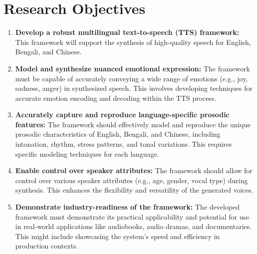 \section*{Research Objectives}

\begin{enumerate}
    \parsep=20pt
    \item \textbf{Develop a robust multilingual text-to-speech (TTS) framework:} This framework will support the synthesis of high-quality speech for English, Bengali, and Chinese. 
    \item \textbf{Model and synthesize nuanced emotional expression:} The framework must be capable of accurately conveying a wide range of emotions (e.g., joy, sadness, anger) in synthesized speech. This involves developing techniques for accurate emotion encoding and decoding within the TTS process.
    \item \textbf{Accurately capture and reproduce language-specific prosodic features:} The framework should effectively model and reproduce the unique prosodic characteristics of English, Bengali, and Chinese, including intonation, rhythm, stress patterns, and tonal variations. This requires specific modeling techniques for each language.
    \item \textbf{Enable control over speaker attributes:} The framework should allow for control over various speaker attributes (e.g., age, gender, vocal type) during synthesis. This enhances the flexibility and versatility of the generated voices.
    \item \textbf{Demonstrate industry-readiness of the framework:} The developed framework must demonstrate its practical applicability and potential for use in real-world applications like audiobooks, audio dramas, and documentaries. This might include showcasing the system's speed and efficiency in production contexts.
\end{enumerate}